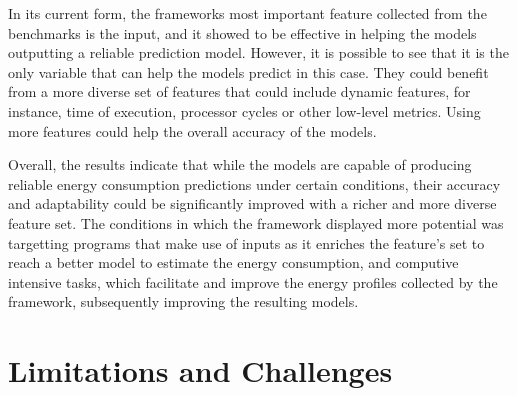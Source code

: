 In its current form, the frameworks most important feature collected from the benchmarks is the input, and it showed to be effective in helping the models outputting a reliable prediction model. However, it is possible to see that it is the only variable that can help the models predict in this case. They could benefit from a more diverse set of features that could include dynamic features, for instance, time of execution, processor cycles or other low-level metrics. Using more features could help the overall accuracy of the models.



Overall, the results indicate that while the models are capable of producing reliable energy consumption predictions under certain conditions, their accuracy and adaptability could be significantly improved with a richer and more diverse feature set. The conditions in which the framework displayed more potential was targetting programs that make use of inputs as it enriches the feature's set to reach a better model to estimate the energy consumption, and computive intensive tasks, which facilitate and improve the energy profiles collected by the framework, subsequently improving the resulting models. 











\section{Limitations and Challenges} \label{sec:limitations_and_challenges}

